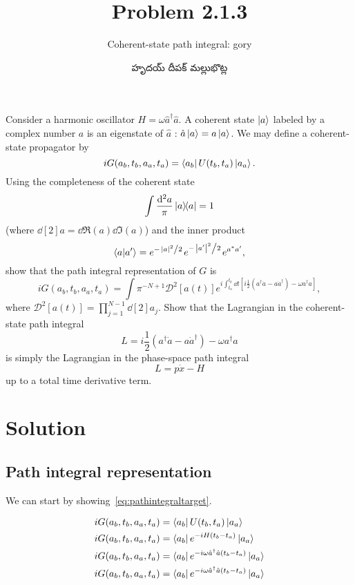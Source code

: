 \documentclass{article}
\title{Problem 2.1.3}
\subtitle{Coherent-state path integral: gory}
\author{\begin{telugu}హృదయ్ దీపక్ మల్లుభొట్ల\end{telugu}}
\newcommand{\msr}{\mathcal{D}}
\begin{document}
	\maketitle
	Consider a harmonic oscillator $H = \omega \hat{a}^\dagger \hat{a}$.
	A coherent state $\ket{a}$ labeled by a complex number $a$ is an eigenstate of $\hat{a}$ : $\hat{a}\ket{a} = a \ket{a}$.
	We may define a coherent-state propagator by
	\begin{equation}
		i G(a_b, t_b, a_a, t_a) = \bra{a_b} U(t_b, t_a) \ket{a_a}.
	\end{equation}
	Using the completeness of the coherent state
	\begin{equation}
		\int \frac{\dd[2]{a}}{\pi}\dyad{a}{a} = 1
	\end{equation}
	(where $\dd[2]{a} = \dd{\Re(a)} \dd{\Im(a)}$) and the inner product
	\begin{equation}
		\bra{a}\ket{a'} = e^{-\flatfrac{\abs{a}^2}{2}} e^{-\flatfrac{\abs{a'}^2}{2}} e^{a^\ast a'},
	\end{equation}
	show that the path integral representation of $G$ is
	\begin{equation}
		i G(a_b, t_b, a_a, t_a) = \int \pi^{-N + 1} \msr^2[a(t)] e^{i \int_{t_a}^{t_b} \dd{t} \left[i \frac12 \left(a^\dagger \dot{a} - a \dot{a}^\dagger \right) - \omega a^\dagger a \right]}, \label{eq:pathintegraltarget}
	\end{equation}
	where $\msr^2[a(t)] = \prod_{j=1}^{N-1} \dd[2]a_j$.
	Show that the Lagrangian in the coherent-state path integral
	\begin{equation}
		L = i\frac12 \left(a^\dagger \dot{a} - a \dot{a}^\dagger \right) - \omega a^\dagger a
	\end{equation}
	is simply the Lagrangian in the phase-space path integral
	\begin{equation}
		L = p\dot{x} - H
	\end{equation}
	up to a total time derivative term.

	\section{Solution} \label{sec:solution}

	\subsection{Path integral representation} \label{subsec:pathintegralrep}
	We can start by showing~\eqref{eq:pathintegraltarget}.

	\begin{align}
		i G(a_b, t_b, a_a, t_a) &= \bra{a_b} U(t_b, t_a) \ket{a_a} \\
		i G(a_b, t_b, a_a, t_a) &= \bra{a_b} e^{-i H (t_b - t_a)} \ket{a_a} \\
		i G(a_b, t_b, a_a, t_a) &= \bra{a_b} e^{-i \omega \hat{a}^\dagger \hat{a} (t_b - t_a)} \ket{a_a} \\
		i G(a_b, t_b, a_a, t_a) &= \bra{a_b} e^{-i \omega \hat{a}^\dagger \hat{a} (t_b - t_a)} \ket{a_a}
	\end{align}



	\newpage
	\listoftodos
\end{document}
